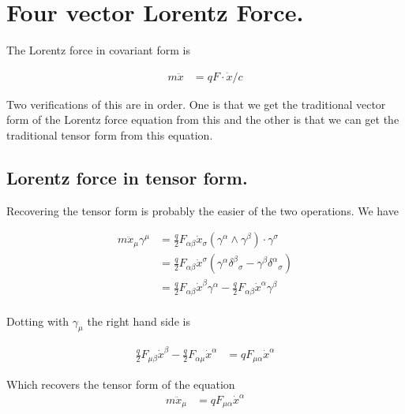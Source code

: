 \section{Four vector Lorentz Force. }

The Lorentz force in covariant form is

%

\begin{align}\label{eqn:seLorentz:lorentzForceGA}
m \ddot{x} &= q F \cdot \dot{x}/c
\end{align}

Two verifications of this are in order.  One is that we get the traditional vector form of the Lorentz force equation from
this and the other is that we can get the traditional tensor form from this equation.

\subsection{Lorentz force in tensor form. }

Recovering the tensor form is probably the easier of the two operations.  We have

\begin{align*}
m \ddot{x}_\mu \gamma^\mu
&= \frac{q}{2} F_{\alpha\beta} \dot{x}_\sigma (\gamma^{\alpha} \wedge \gamma^\beta) \cdot \gamma^\sigma \\
&= \frac{q}{2} F_{\alpha\beta} \dot{x}^\sigma (\gamma^{\alpha} {\delta^\beta}_\sigma -\gamma^{\beta} {\delta^\alpha}_\sigma ) \\
&= \frac{q}{2} F_{\alpha\beta} \dot{x}^\beta \gamma^{\alpha} - \frac{q}{2} F_{\alpha\beta} \dot{x}^\alpha \gamma^{\beta} \\
\end{align*}

Dotting with $\gamma_\mu$ the right hand side is

\begin{align*}
\frac{q}{2} F_{\mu\beta} \dot{x}^\beta - \frac{q}{2} F_{\alpha\mu} \dot{x}^\alpha 
&= {q} F_{\mu\alpha} \dot{x}^\alpha 
\end{align*}

Which recovers the tensor form of the equation
\begin{align}\label{eqn:seLorentz:lorentzForceTensor}
m \ddot{x}_\mu &= {q} F_{\mu\alpha} \dot{x}^\alpha 
\end{align}

